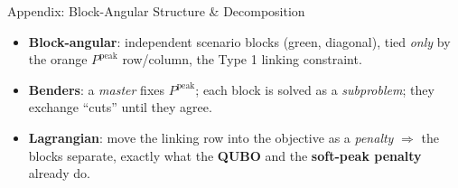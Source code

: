 \documentclass[aspectratio=169]{beamer}
\begin{document}
\begin{frame}{Appendix: Block-Angular Structure \& Decomposition}
\centering
{}
\vspace{0.25cm}
\begin{itemize}\footnotesize
    \item \textbf{Block-angular}: independent scenario blocks (green, diagonal),
          tied \emph{only} by the orange $P^{\text{peak}}$ row/column, the Type 1
          linking constraint.
    \item \textbf{Benders}: a \emph{master} fixes $P^{\text{peak}}$; each block is
          solved as a \emph{subproblem}; they exchange ``cuts'' until they agree.
    \item \textbf{Lagrangian}: move the linking row into the objective as a
          \emph{penalty} $\Rightarrow$ the blocks separate, exactly what the
          \textbf{QUBO} and the \textbf{soft-peak penalty} already do.
\end{itemize}
\end{frame}
\end{document}
